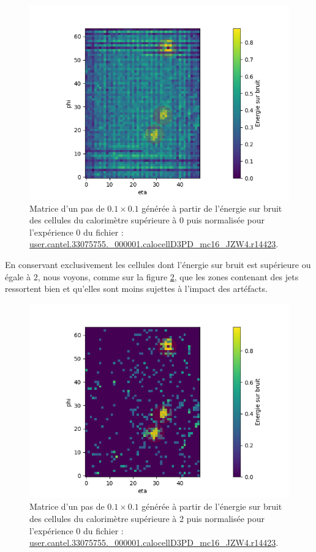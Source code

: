\begin{figure}[hbt!]
    \centering
    \includegraphics[scale=0.7]{Figures/dataset/matrix_post_traitement_reduced_0.png}
    \caption{Matrice d'un pas de $0.1 \times 0.1$ générée à partir de l'énergie sur bruit des cellules du calorimètre supérieure à 0 puis normalisée pour l'expérience 0 du fichier : \url{user.cantel.33075755.\_000001.calocellD3PD\_mc16\_JZW4.r14423}.}
    \label{fig:matrix_post_traitement_reduced_0}
\end{figure}

\break

En conservant exclusivement les cellules dont l'énergie sur bruit est supérieure ou égale à $2$, nous voyons, comme sur la figure \ref{fig:matrix_post_traitement_reduced_2}, que les zones contenant des jets ressortent bien et qu'elles sont moins sujettes à l'impact des artéfacts.

\begin{figure}[hbt!]
    \centering
    \includegraphics[scale=0.7]{Figures/dataset/matrix_post_traitement_reduced_2.png}
    \caption{Matrice d'un pas de $0.1 \times 0.1$ générée à partir de l'énergie sur bruit des cellules du calorimètre supérieure à 2 puis normalisée pour l'expérience 0 du fichier : \url{user.cantel.33075755.\_000001.calocellD3PD\_mc16\_JZW4.r14423}.}
    \label{fig:matrix_post_traitement_reduced_2}
\end{figure}

